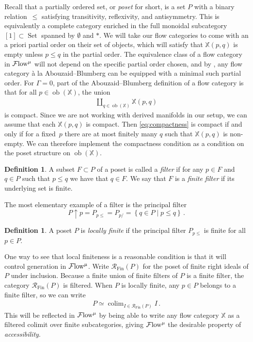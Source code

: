\documentclass[10pt]{amsart}
\numberwithin{equation}{section}
\theoremstyle{definition}
\newtheorem{definition}[prop]{Definition}
\DeclareMathOperator{\ob}{ob}
\DeclareMathOperator{\Set}{Set}
\DeclareMathOperator{\Fin}{Fin}
\DeclareMathOperator*{\colim}{colim}
\newcommand{\Flow}{\cF\mathrm{low}\vphantom{w}}
\newcommand{\bX}{\mathbb{X}}
\newcommand{\cR}{\mathcal{R}}
\newcommand{\cF}{\mathcal{F}}
\begin{document}
Recall that a partially ordered set, or \emph{poset} for short, is a set $P$ with a binary relation~$\leq$ satisfying transitivity, reflexivity, and antisymmetry.
This is equivalently a complete category enriched in the full monoidal subcategory $[1]\subset \Set$ spanned by $\emptyset$ and $\ast$.
We will take our flow categories to come with an a priori partial order on their set of objects, which will satisfy that $\bX(p,q)$ is empty unless $p\leq q$ in the partial order.
The equivalence class of a flow category in $\Flow^{\mu}$ will not depend on the specific partial order chosen, and by \cite[Remark 1.4]{AB}, any flow category à la Abouzaid--Blumberg can be equipped with a minimal such partial order.
For $\Gamma = 0$, part of the Abouzaid--Blumberg definition of a flow category \cite[Definition 3.4]{AB} is that for all $p\in \ob(\bX)$, the union
\begin{align}\label{eq:compactness}
	\coprod_{q\in \ob(\bX)} \bX(p,q)
\end{align}
is compact. Since we are not working with derived manifolds in our setup, we can assume that each $\bX(p,q)$ is compact.
Then \eqref{eq:compactness} is compact if and only if for a fixed~$p$ there are at most finitely many $q$ such that $\bX(p,q)$ is non-empty.
We can therefore implement the compactness condition as a condition on the poset structure on $\ob(\bX)$.

\begin{definition}\label{def:filter}
	A subset $F\subset P$ of a poset is called a \emph{filter} if for any $p\in F$ and  $q\in P$ such that $p\leq q$ we have that $q\in F$.
	We say that $F$ is a \emph{finite filter} if its underlying set is finite.
\end{definition}

The most elementary example of a filter is the principal filter
\[
P \uparrow p = P_{p\leq} = P_{p/} = \left\{ q\in P \mid p\leq q\right\} \,.
\]
\begin{definition}\label{def:locally_finite}
	A poset $P$ is \emph{locally finite} if the principal filter $P_{p\leq}$ is finite for all $p\in P$.
\end{definition}
One way to see that local finiteness is a reasonable condition is that it will control generation in $\Flow^{\mu}$.
Write $\cR_{\Fin}(P)$ for the poset of finite right ideals of $P$ under inclusion.
Because a finite union of finite filters of $P$ is a finite filter, the category $\cR_{\Fin}(P)$ is filtered.
When $P$ is locally finite, any $p\in P$ belongs to a finite filter, so we can write
\begin{align*}
	P \simeq \colim_{I\in \cR_{\Fin}(P)} I \,.
\end{align*}
 This will be reflected in $\Flow^{\mu}$ by being able to write any flow category $\bX$ as a filtered colimit over finite subcategories, giving $\Flow^{\mu}$ the desirable property of \emph{accessibility}.
\end{document}
